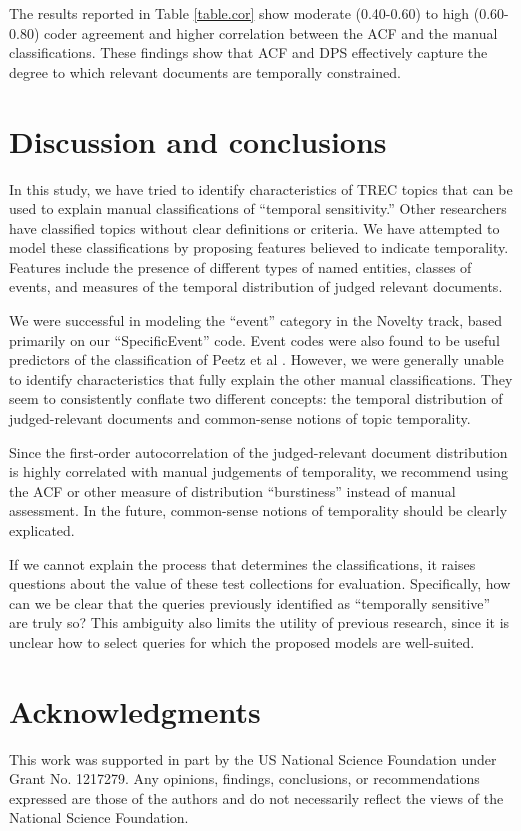 \documentclass{sig-alternate-05-2015}
\begin{document}
The results reported in Table \ref{table.cor} show moderate (0.40-0.60) to high (0.60-0.80) coder agreement and higher correlation between the ACF and the manual classifications. These findings show that ACF and DPS effectively capture the degree to which relevant documents are temporally constrained. 

\section{Discussion and conclusions}

In this study, we have tried to identify characteristics of TREC topics that can be used to explain manual classifications of ``temporal sensitivity.'' Other researchers have classified topics without clear definitions or criteria. We have attempted to model these classifications by proposing features believed to indicate temporality.  Features include the presence of different types of named entities, classes of events, and measures of the temporal distribution of judged relevant documents.

We were successful in modeling the ``event'' category in the Novelty track, based primarily on our ``SpecificEvent'' code.  Event codes were also found to be useful predictors of the classification of Peetz et al \cite{Peetz2013a}.  However, we were generally unable to identify characteristics that fully explain the other manual classifications. They seem to consistently conflate two different concepts: the temporal distribution of judged-relevant documents and common-sense notions of topic temporality.  

Since the first-order autocorrelation of the judged-relevant document distribution is highly correlated with manual judgements of temporality, we recommend using the ACF or other measure of distribution ``burstiness'' instead of manual assessment.  In the future, common-sense notions of temporality should be clearly explicated.  

If we cannot explain the process that determines the classifications, it raises questions about the value of these test collections for evaluation. Specifically, how can we be clear that the queries previously identified as ``temporally sensitive'' are truly so? This ambiguity also limits the utility of previous research, since it is unclear how to select queries for which the proposed models are well-suited.	

\section{Acknowledgments}
This work was supported in part by the US National Science Foundation under Grant No. 1217279. Any opinions, findings, conclusions, or recommendations expressed are those of the authors and do not necessarily reflect the views of the National Science Foundation. 


  
\end{document}

